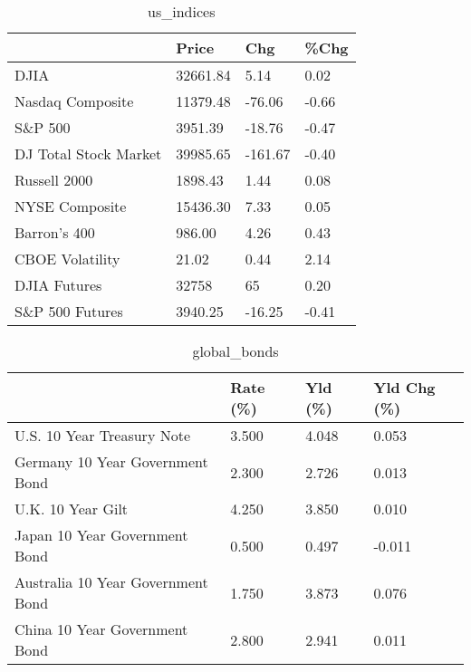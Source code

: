 \documentclass{article}%
\begin{document}
%


\begin{table}[htbp]%
\caption{us\_indices}%
\centering%
\begin{adjustbox}{width=1\textwidth}%
\begin{tabular}{llll}
\toprule
                      &    Price &     Chg &  \%Chg \\
\midrule
                 DJIA & 32661.84 &    5.14 &  0.02 \\
     Nasdaq Composite & 11379.48 &  -76.06 & -0.66 \\
              S\&P 500 &  3951.39 &  -18.76 & -0.47 \\
DJ Total Stock Market & 39985.65 & -161.67 & -0.40 \\
         Russell 2000 &  1898.43 &    1.44 &  0.08 \\
       NYSE Composite & 15436.30 &    7.33 &  0.05 \\
         Barron's 400 &   986.00 &    4.26 &  0.43 \\
      CBOE Volatility &    21.02 &    0.44 &  2.14 \\
         DJIA Futures &    32758 &      65 &  0.20 \\
      S\&P 500 Futures &  3940.25 &  -16.25 & -0.41 \\
\bottomrule
\end{tabular}
%
\end{adjustbox}%
\end{table}

%


\begin{table}[htbp]%
\caption{global\_bonds}%
\centering%
\begin{adjustbox}{width=1\textwidth}%
\begin{tabular}{llll}
\toprule
                                  & Rate (\%) & Yld (\%) & Yld Chg (\%) \\
\midrule
       U.S. 10 Year Treasury Note &    3.500 &   4.048 &       0.053 \\
  Germany 10 Year Government Bond &    2.300 &   2.726 &       0.013 \\
                U.K. 10 Year Gilt &    4.250 &   3.850 &       0.010 \\
    Japan 10 Year Government Bond &    0.500 &   0.497 &      -0.011 \\
Australia 10 Year Government Bond &    1.750 &   3.873 &       0.076 \\
    China 10 Year Government Bond &    2.800 &   2.941 &       0.011 \\
\bottomrule
\end{tabular}
%
\end{adjustbox}%
\end{table}
\end{document}

